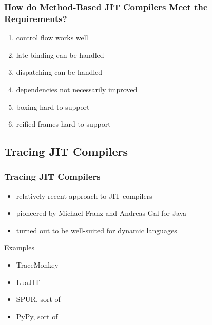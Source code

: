 \documentclass[utf8x]{beamer}
\begin{document}
\begin{frame}
  \frametitle{How do Method-Based JIT Compilers Meet the Requirements?}
  \begin{enumerate}
      \item control flow works well
      \item late binding can be handled
      \item dispatching can be handled
      \item \alert{dependencies not necessarily improved}
      \item boxing hard to support
      \item \alert{reified frames hard to support}
  \end{enumerate}
\end{frame}



\subsection{Tracing JIT Compilers}

\begin{frame}
  \frametitle{Tracing JIT Compilers}
  \begin{itemize}
      \item relatively recent approach to JIT compilers
      \item pioneered by Michael Franz and Andreas Gal for Java
      \item turned out to be well-suited for dynamic languages
  \end{itemize}
  \pause
  \begin{block}{Examples}
      \begin{itemize}
          \item \alert{TraceMonkey}
          \item \alert{LuaJIT}
          \item \alert{SPUR}, sort of
          \item \alert{PyPy}, sort of
      \end{itemize}
  \end{block}
\end{frame}
\end{document}

